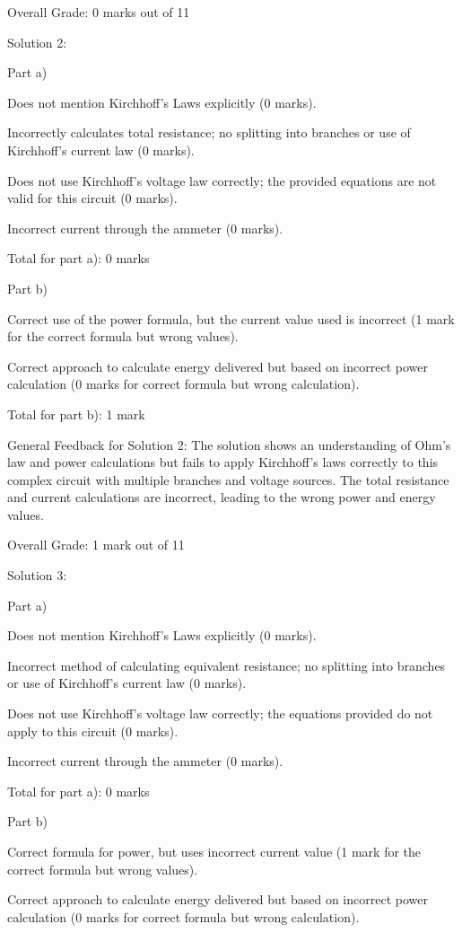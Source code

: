 \documentclass[a4paper,11pt]{article}
\begin{document}
Overall Grade: 0 marks out of 11

Solution 2:

Part a)

Does not mention Kirchhoff's Laws explicitly (0 marks).

Incorrectly calculates total resistance; no splitting into branches or use of Kirchhoff's current law (0 marks).

Does not use Kirchhoff's voltage law correctly; the provided equations are not valid for this circuit (0 marks).

Incorrect current through the ammeter (0 marks).

Total for part a): 0 marks

Part b)

Correct use of the power formula, but the current value used is incorrect (1 mark for the correct formula but wrong values).

Correct approach to calculate energy delivered but based on incorrect power calculation (0 marks for correct formula but wrong calculation).

Total for part b): 1 mark

General Feedback for Solution 2:
The solution shows an understanding of Ohm's law and power calculations but fails to apply Kirchhoff's laws correctly to this complex circuit with multiple branches and voltage sources. The total resistance and current calculations are incorrect, leading to the wrong power and energy values.

Overall Grade: 1 mark out of 11

Solution 3:

Part a)

Does not mention Kirchhoff's Laws explicitly (0 marks).

Incorrect method of calculating equivalent resistance; no splitting into branches or use of Kirchhoff's current law (0 marks).

Does not use Kirchhoff's voltage law correctly; the equations provided do not apply to this circuit (0 marks).

Incorrect current through the ammeter (0 marks).

Total for part a): 0 marks

Part b)

Correct formula for power, but uses incorrect current value (1 mark for the correct formula but wrong values).

Correct approach to calculate energy delivered but based on incorrect power calculation (0 marks for correct formula but wrong calculation).
\end{document}
